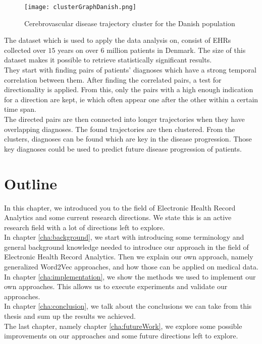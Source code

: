\begin{figure}[!htb]
	\centering
	\texttt{[image: clusterGraphDanish.png]}
	\caption{Cerebrovascular disease trajectory cluster for the Danish population \cite{Brunak:article}}
	\label{fig:clusterGraphDanish}
\end{figure}

The dataset which is used to apply the data analysis on, consist of EHRs collected over $15$ years on over $6$ million patients in Denmark. The size of this dataset makes it possible to retrieve statistically significant results. \\

They start with finding pairs of patients' diagnoses which have a strong temporal correlation between them. After finding the correlated pairs, a test for directionality is applied. From this, only the pairs with a high enough indication for a direction are kept, ie which often appear one after the other within a certain time span. \\

The directed pairs are then connected into longer trajectories when they have overlapping diagnoses. The found trajectories are then clustered. From the clusters, diagnoses can be found which are key in the disease progression. Those key diagnoses could be used to predict future disease progression of patients. 



\section{Outline}
\label{sec:outline}

In this chapter, we introduced you to the field of Electronic Health Record Analytics and some current research directions. We state this is an active research field with a lot of directions left to explore. \\
In chapter \ref{cha:background}, we start with introducing some terminology and general background knowledge needed to introduce our approach in the field of Electronic Health Record Analytics. Then we explain our own approach, namely generalized Word2Vec approaches, and how those can be applied on medical data. \\
In chapter \ref{cha:implementation}, we show the methods we used to implement our own approaches. This allows us to execute experiments and validate our approaches. \\
In chapter \ref{cha:conclusion}, we talk about the conclusions we can take from this thesis and sum up the results we achieved. \\
The last chapter, namely chapter \ref{cha:futureWork}, we explore some possible improvements on our approaches and some future directions left to explore.


